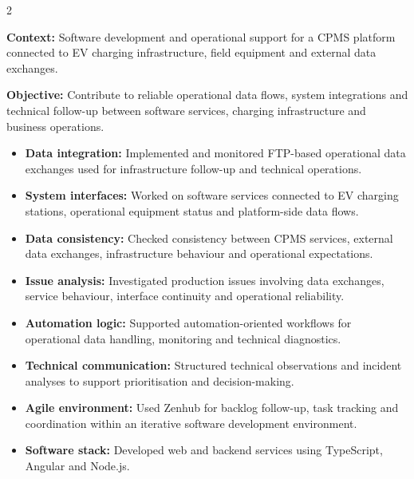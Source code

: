 \documentclass[8pt,a4paper,ragged2e,withhyper]{altacv}
\begin{document}



\makecvheader
\vspace{-0.3cm}


\begin{paracol}{2}



\textbf{Context:} Software development and operational support for a CPMS platform connected to EV charging infrastructure, field equipment and external data exchanges.

\textbf{Objective:} Contribute to reliable operational data flows, system integrations and technical follow-up between software services, charging infrastructure and business operations.

\begin{itemize}
  \item \textbf{Data integration:} Implemented and monitored FTP-based operational data exchanges used for infrastructure follow-up and technical operations.
  \item \textbf{System interfaces:} Worked on software services connected to EV charging stations, operational equipment status and platform-side data flows.
  \item \textbf{Data consistency:} Checked consistency between CPMS services, external data exchanges, infrastructure behaviour and operational expectations.
  \item \textbf{Issue analysis:} Investigated production issues involving data exchanges, service behaviour, interface continuity and operational reliability.
  \item \textbf{Automation logic:} Supported automation-oriented workflows for operational data handling, monitoring and technical diagnostics.
  \item \textbf{Technical communication:} Structured technical observations and incident analyses to support prioritisation and decision-making.
  \item \textbf{Agile environment:} Used Zenhub for backlog follow-up, task tracking and coordination within an iterative software development environment.
  \item \textbf{Software stack:} Developed web and backend services using TypeScript, Angular and Node.js.
\end{itemize}


\end{paracol}
\end{document}
